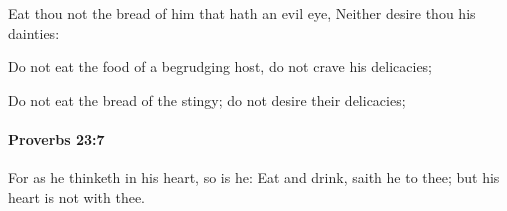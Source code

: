 			\begin{versebox}
					\item[BHS] 
					\item[ASV] Eat thou not the bread of him that hath an evil eye, Neither desire thou his dainties:
					\item[NIV] Do not eat the food of a begrudging host, do not crave his delicacies;
					\item[NRSV] Do not eat the bread of the stingy; do not desire their delicacies;
			\end{versebox}

		\paragraph{Proverbs 23:7} %
			\label{PROVERBS-23-7}

			For as he thinketh in his heart, so is he: Eat and drink, saith he to thee; but his heart is not with thee.


